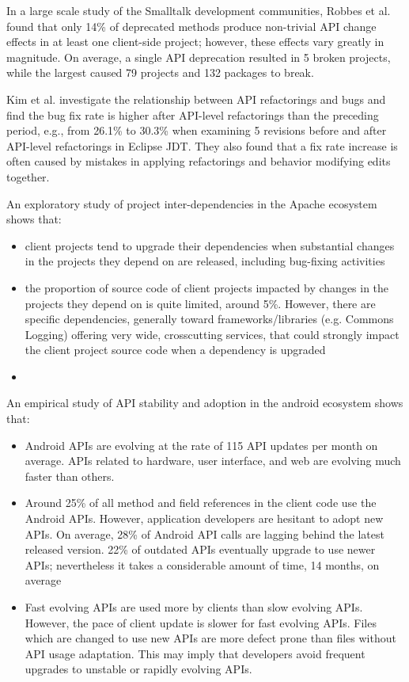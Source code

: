 In a large scale study of the Smalltalk development communities, Robbes et al.
\cite{robbes_how_2012} found that only 14\% of deprecated methods produce
non-trivial API change effects in at least one client-side project; however,
these effects vary greatly in magnitude. On average, a single API deprecation
resulted in 5 broken projects, while the largest caused 79 projects
and 132 packages to break.

Kim et al. \cite{kim_empirical_2011} investigate the relationship between API
refactorings and bugs and find the bug fix rate is higher after API-level refactorings than the preceding
period, e.g., from 26.1\% to 30.3\% when examining 5 revisions
before and after API-level refactorings in Eclipse JDT. They also found that a
fix rate increase is often caused by mistakes in applying refactorings and
behavior modifying edits together.


An exploratory study of project inter-dependencies in the 
Apache ecosystem \cite{bavota_evolution_2013} shows that:
\begin{itemize}
  \item client projects tend to upgrade their dependencies when substantial changes in the projects they depend on are released,
including bug-fixing activities
\item the proportion
of source code of client projects impacted by changes in
the projects they depend on is quite limited, around 5\%.
However, there are specific dependencies, generally toward frameworks/libraries
(e.g.  Commons Logging) offering very wide, crosscutting services, that could strongly
impact the client project source code when a dependency is upgraded
\item 
\end{itemize} 


An empirical study of API stability and adoption in the android ecosystem
\cite{mcdonnell_empirical_2013} shows that:
\begin{itemize}
  \item Android APIs are evolving
at the rate of 115 API updates per month on average.
APIs related to hardware, user interface, and web are
evolving much faster than others.
  \item Around 25\% of all method and field references in the
client code use the Android APIs. However, application
developers are hesitant to adopt new APIs. On average,
28\% of Android API calls are lagging behind the latest
released version. 22\% of outdated APIs eventually
upgrade to use newer APIs; nevertheless it takes a
considerable amount of time, 14 months, on average
\item Fast evolving APIs are used
more by clients than slow evolving APIs. However, the pace of client update is
slower for fast evolving APIs.
Files which are changed to use new APIs are more
defect prone than files without API usage adaptation.
This may imply that developers avoid frequent upgrades
to unstable or rapidly evolving APIs.
\end{itemize}


